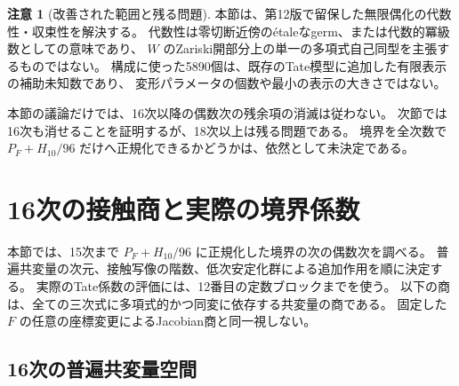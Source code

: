 \documentclass[a4paper,11pt]{ltjsarticle}
\theoremstyle{definition}
\newtheorem{remark}[theorem]{注意}
\begin{document}
\begin{remark}[改善された範囲と残る問題]
本節は、第12版で留保した無限偶化の代数性・収束性を解決する。
代数性は零切断近傍の\'etaleなgerm、または代数的冪級数としての意味であり、
$W$ のZariski開部分上の単一の多項式自己同型を主張するものではない。
構成に使った5890個は、既存のTate模型に追加した有限表示の補助未知数であり、
変形パラメータの個数や最小の表示の大きさではない。

本節の議論だけでは、16次以降の偶数次の残余項の消滅は従わない。
次節では16次も消せることを証明するが、18次以上は残る問題である。
境界を全次数で $P_F+H_{10}/96$ だけへ正規化できるかどうかは、依然として未決定である。
\end{remark}


\clearpage
\section{16次の接触商と実際の境界係数}
\label{sec:contact-sixteen}

本節では、15次まで $P_F+H_{10}/96$ に正規化した境界の次の偶数次を調べる。
普遍共変量の次元、接触写像の階数、低次安定化群による追加作用を順に決定する。
実際のTate係数の評価には、12番目の定数ブロックまでを使う。
以下の商は、全ての三次式に多項式的かつ同変に依存する共変量の商である。
固定した $F$ の任意の座標変更によるJacobian商と同一視しない。


\subsection{16次の普遍共変量空間}
\label{subsec:v13-sixteenth-characters}
\end{document}

